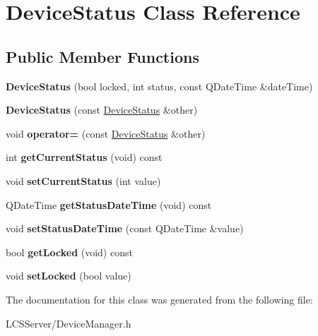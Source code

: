 \hypertarget{class_device_status}{}\section{Device\+Status Class Reference}
\label{class_device_status}
\subsection*{Public Member Functions}
\begin{DoxyCompactItemize}
\item 
\mbox{\label{class_device_status_a64d53902c3af6f9c0a3c1eb8c2f9ac69}} 
{\bfseries Device\+Status} (bool locked, int status, const Q\+Date\+Time \&date\+Time)
\item 
\mbox{\label{class_device_status_a79f1d523ceb98afe28170daf26b781a3}} 
{\bfseries Device\+Status} (const \hyperlink{class_device_status}{Device\+Status} \&other)
\item 
\mbox{\label{class_device_status_ae822d2aff82fe04ab32d037e44dd01fb}} 
void {\bfseries operator=} (const \hyperlink{class_device_status}{Device\+Status} \&other)
\item 
\mbox{\label{class_device_status_a0bd9c473925b1ebab816df6b96078a43}} 
int {\bfseries get\+Current\+Status} (void) const
\item 
\mbox{\label{class_device_status_ae4f58c4b39533c3965d85bef2163c054}} 
void {\bfseries set\+Current\+Status} (int value)
\item 
\mbox{\label{class_device_status_a0cf30022d1b60999a58fbfb84307aa72}} 
Q\+Date\+Time {\bfseries get\+Status\+Date\+Time} (void) const
\item 
\mbox{\label{class_device_status_a788e3212b95a214e99eb90a7a0448726}} 
void {\bfseries set\+Status\+Date\+Time} (const Q\+Date\+Time \&value)
\item 
\mbox{\label{class_device_status_a9ccab45320a1bf09c599bd2cdfd05257}} 
bool {\bfseries get\+Locked} (void) const
\item 
\mbox{\label{class_device_status_aeec173f78766305c666877983e75d957}} 
void {\bfseries set\+Locked} (bool value)
\end{DoxyCompactItemize}


The documentation for this class was generated from the following file\+:\begin{DoxyCompactItemize}
\item 
L\+C\+S\+Server/Device\+Manager.\+h\end{DoxyCompactItemize}
